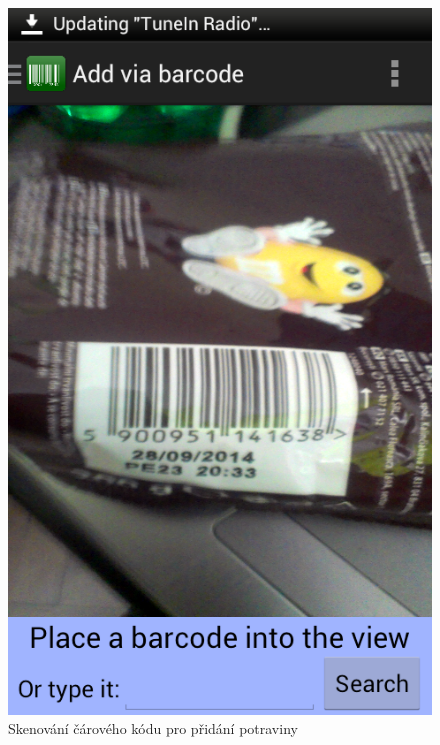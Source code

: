 \documentclass[thesis=B,czech]{FITthesis}[2013/10/20]
\begin{document}
\begin{figure}[H]
  \begin{minipage}{0.5\linewidth} 
    \centering
    \includegraphics[scale=0.3]{screenshots/app_scan_add.png}
    \caption{Skenování čárového kódu pro přidání potraviny}
    \label{fig:AppScanAdd}
  \end{minipage}
  \begin{minipage}{0.5\linewidth} 
    \centering

\end{minipage}
\end{figure}
\end{document}
